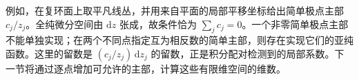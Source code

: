 例如，在复环面上取平凡线丛，并用来自平面的局部平移坐标给出简单极点主部 \(c_j/z_j\)。全纯微分空间由 \(\mathrm{d}z\) 张成，故条件恰为 \(\sum_jc_j=0\)。一个非零简单极点主部不能单独实现；在两个不同点指定互为相反数的简单主部，则存在实现它们的亚纯函数。这里的留数是 \((c_j/z_j)\,\mathrm{d}z_j\) 的留数，正是积分配对检测到的局部系数。下一节将通过逐点增加可允许的主部，计算这些有限维空间的维数。
